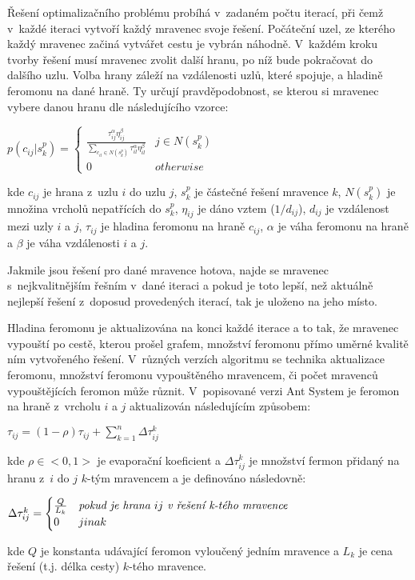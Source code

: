 \documentclass[a4paper, 12pt]{article}
\begin{document}
Řešení optimalizačního problému probíhá v~zadaném počtu iterací, při čemž v~každé iteraci vytvoří každý mravenec svoje řešení.
Počáteční uzel, ze kterého každý mravenec začiná vytvářet cestu je vybrán náhodně.
V~každém kroku tvorby řešení musí mravenec zvolit další hranu, po níž bude pokračovat do dalšího uzlu. Volba hrany záleží na vzdálenosti uzlů, které spojuje, a
hladině feromonu na dané hraně. Ty určují pravděpodobnost, se kterou si mravenec vybere danou hranu dle následujícího vzorce:
\begin{center}
  $p(c_{ij}|s_k^p) =
   \begin{cases} 
      \frac{\tau^{\alpha}_{ij}\eta^{\beta}_{ij}}{\sum\limits_{c_{il}\in N(s_k^p)}{\tau^\alpha_{il}\eta^\beta_{il}}} & j \in N(s_k^p) \\
      0 & otherwise 
   \end{cases}
   $
\end{center}
kde $c_{ij}$ je hrana z~uzlu $i$ do uzlu $j$, $s_k^p$ je částečné řešení mravence $k$, $N(s_k^p)$ je množina vrcholů nepatřících do $s_k^p$, $\eta_{ij}$ je 
dáno vztem ($1/d_{ij}$), $d_{ij}$ je vzdálenost mezi uzly $i$ a $j$, $\tau_{ij}$ je hladina feromonu na hraně $c_{ij}$, $\alpha$ je váha feromonu na hraně
a $\beta$ je váha vzdálenosti $i$ a $j$.

Jakmile jsou řešení pro dané mravence hotova, najde se mravenec s~nejkvalitnějším řešním v~dané iteraci a pokud je toto lepší, než aktuálně nejlepší řešení
z~doposud provedených iterací, tak je uloženo na jeho místo.

Hladina feromonu je aktualizována na konci každé iterace a to tak, že mravenec vypouští po cestě, kterou prošel grafem, množství feromonu přímo uměrné kvalitě
ním vytvořeného řešení. V~různých verzích algoritmu se technika aktualizace feromonu, množství feromonu vypouštěného mravencem, či počet mravenců vypouštějících 
feromon může různit. V~popisované verzi Ant System je feromon na hraně z~vrcholu $i$ a $j$ aktualizován následujícím způsobem:
\begin{center}
  $\tau_{ij}=(1-\rho)\tau_{ij}+\sum\limits_{k=1}^{n}\Delta\tau_{ij}^k$
\end{center}
kde $\rho \in <0,1>$ je evaporační koeficient a $\Delta\tau_{ij}^k$ je množství fermon přidaný na hranu z~$i$ do $j$ $k$-tým mravencem a je definováno následovně:
\begin{center}
  $\Delta\tau_{ij}^k = 
  \begin{cases}
    \frac{Q}{L_k} & \emph{pokud je hrana } ij \emph{ v~řešení k-tého mravence}\\
    0 & jinak
   \end{cases}
   $
\end{center}
kde $Q$ je konstanta udávající feromon vyloučený jedním mravence a $L_k$ je cena řešení (t.j. délka cesty) $k$-tého mravence.
\end{document}
